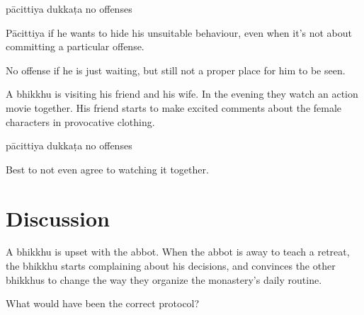\begin{exam}{\autoExamName}
\begin{problem*}
\begin{parts}
      \bigskip

      \begin{answers}{3}
        \bChoices
         pācittiya\eAns
         dukkaṭa\eAns
         no offenses\eAns
        \eChoices
      \end{answers}

      \begin{solution}
        Pācittiya if he wants to hide his unsuitable behaviour, even when it's not about committing a particular offense.

        No offense if he is just waiting, but still not a proper place for him to be seen.
      \end{solution}

      \bigskip

      \item A bhikkhu is visiting his friend and his wife. In the evening they
      watch an action movie together. His friend starts to make excited comments
      about the female characters in provocative clothing.

      \bigskip

      \begin{answers}{3}
        \bChoices
         pācittiya\eAns
         dukkaṭa\eAns
         no offenses\eAns
        \eChoices
      \end{answers}

      \begin{solution}
        Best to not even agree to watching it together.
      \end{solution}

    \end{parts}

  \end{problem*}

\end{exam}

\section*{Discussion}

A bhikkhu is upset with the abbot. When the abbot is away to teach a retreat,
the bhikkhu starts complaining about his decisions, and convinces the other
bhikkhus to change the way they organize the monastery's daily routine.

What would have been the correct protocol?
